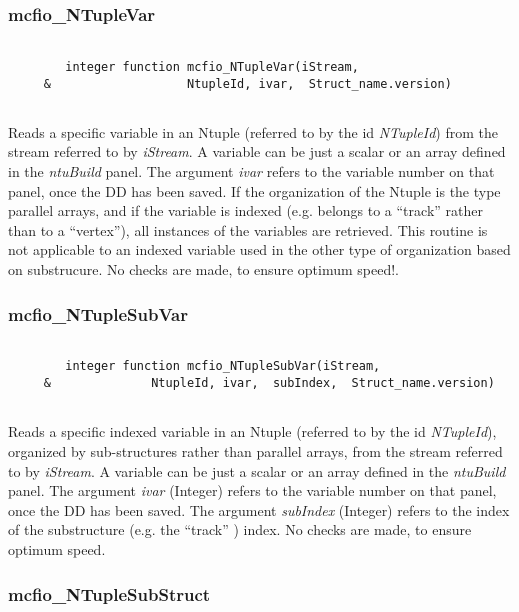  
\subsubsection{mcfio\_NTupleVar}

\begin{verbatim}

        integer function mcfio_NTupleVar(iStream,
     &                   NtupleId, ivar,  Struct_name.version)
     
\end{verbatim}

Reads a specific variable in an Ntuple (referred to by the id {\em NTupleId})  from
the stream referred to by {\em iStream}.   A variable can be just a scalar or an array
defined in the {\em ntuBuild} panel. The argument {\em ivar} refers to the 
variable number on that panel, once the DD has been saved. If the organization
of the Ntuple  is the type parallel arrays, and if the variable is indexed
(e.g. belongs to  a ``track'' rather than to a ``vertex''), all instances of the
variables are  retrieved.  This routine is not applicable to an indexed
variable used in  the other type of organization based on substrucure. 
No checks are made, to ensure optimum speed!.  

\subsubsection{mcfio\_NTupleSubVar}

\begin{verbatim}

        integer function mcfio_NTupleSubVar(iStream,
     &              NtupleId, ivar,  subIndex,  Struct_name.version)
     
\end{verbatim}

Reads a specific indexed variable in an Ntuple (referred to by the id {\em
NTupleId}), organized by sub-structures rather than parallel arrays, from the
stream referred to by {\em iStream}.   A variable can be just a scalar or an array
defined in the {\em ntuBuild} panel. The argument {\em ivar} (Integer) refers
to the  variable number on that panel, once the DD has been saved. The
argument  {\em subIndex}  (Integer) refers to the index of the substructure
(e.g. the ``track'' ) index. 
No checks are made, to ensure optimum speed.  

\subsubsection{mcfio\_NTupleSubStruct}

